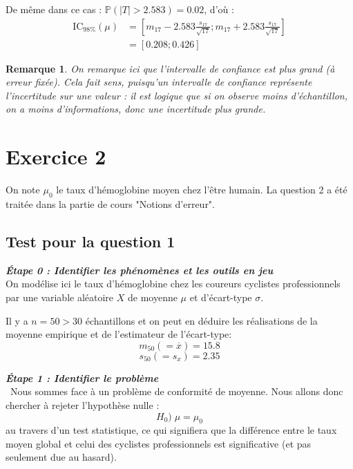 \documentclass[a4paper,oneside,12pt]{article}
\theoremstyle{plain}
\newtheorem*{remark}{Remarque}
\def\P{{\mathbb P}}
\begin{document}
\begin{enumerate}
    De même dans ce cas : $\P\left(\left|T\right|>2.583\right) = 0.02$, d'où :
    \begin{align*}
        \mbox{IC}_{98\%}(\mu) &= \left[m_{17}-2.583\frac{s_{17}}{\sqrt{17}} ; m_{17}+2.583\frac{s_{17}}{\sqrt{17}}\right]\\
        &=\left[0.208 ; 0.426\right] 
    \end{align*}    
    
    \begin{remark}
    On remarque ici que l'intervalle de confiance est plus grand (à erreur fixée). Cela fait sens, puisqu'un intervalle de confiance représente l'incertitude sur une valeur : il est logique que si on observe moins d'échantillon, on a moins d'informations, donc une incertitude plus grande.
    \end{remark}
\end{enumerate}


\section*{Exercice 2}

On note $\mu_0$ le taux d'hémoglobine moyen chez l'être humain. La question 2 a été traitée dans la partie de cours "Notions d'erreur".



\subsection*{Test pour la question 1}

\textit{\textbf{Étape 0 : Identifier les phénomènes et les outils en jeu}}\\
On modélise ici le taux d'hémoglobine chez les coureurs cyclistes professionnels par une variable aléatoire $X$ de moyenne $\mu$ et d'écart-type $\sigma$.
    
Il y a $n = 50>30$ échantillons et on peut en déduire les réalisations de la moyenne empirique et de l'estimateur de l'écart-type:
$$m_{50} (=\overline{x}) = 15.8$$
$$s_{50} (=s_{x}) = 2.35$$
    
\textit{\textbf{Étape 1 : Identifier le problème}}\\\
Nous sommes face à un problème de conformité de moyenne. Nous allons donc chercher à rejeter l'hypothèse nulle :
$$H_0) \;\mu=\mu_0$$ 
au travers d'un test statistique, ce qui signifiera que la différence entre le taux moyen global et celui des cyclistes professionnels est significative (et pas seulement due au hasard).\\
    
\end{document}
